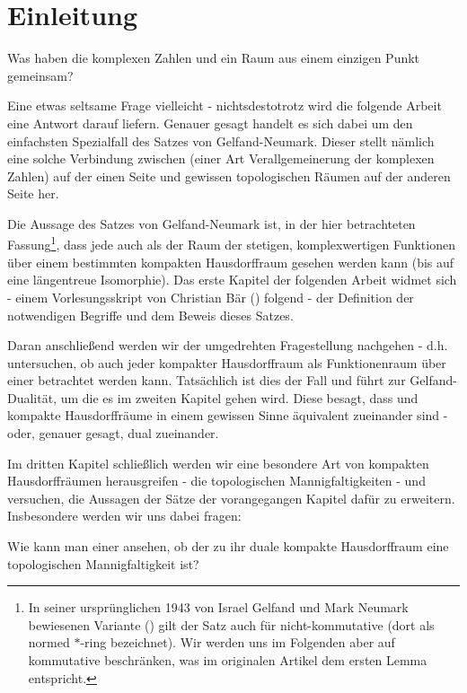 {}
\section*{Einleitung}

\begin{center}
Was haben die komplexen Zahlen und ein Raum aus einem einzigen Punkt gemeinsam? 
\end{center}

Eine etwas seltsame Frage vielleicht - nichtsdestotrotz wird die folgende Arbeit eine Antwort darauf liefern. Genauer gesagt handelt es sich dabei um den einfachsten Spezialfall des Satzes von Gelfand-Neumark. Dieser stellt nämlich eine solche Verbindung zwischen \CAlgn{} (einer Art Verallgemeinerung der komplexen Zahlen) auf der einen Seite und gewissen topologischen Räumen auf der anderen Seite her. 

Die Aussage des Satzes von Gelfand-Neumark ist, in der hier betrachteten Fassung\footnote{In seiner ursprünglichen 1943 von Israel Gelfand und Mark Neumark bewiesenen Variante (\cite[Theorem 1]{GN1943}) gilt der Satz auch für nicht-kommutative \CAlgn{} (dort als \glqq normed $*$-ring\grqq{} bezeichnet). Wir werden uns im Folgenden aber auf kommutative \CAlgn{} beschränken, was im originalen Artikel dem ersten Lemma entspricht.}, dass jede \CAlg{} auch als der Raum der stetigen, komplexwertigen Funktionen über einem bestimmten kompakten Hausdorffraum gesehen werden kann (bis auf eine längentreue Isomorphie). Das erste Kapitel der folgenden Arbeit widmet sich - einem Vorlesungsskript von Christian Bär (\cite[S. 49-69]{Baer2003}) folgend - der Definition der notwendigen Begriffe und dem Beweis dieses Satzes.

Daran anschließend werden wir der \glqq umgedrehten\grqq{} Fragestellung nachgehen - d.h. untersuchen, ob auch jeder kompakter Hausdorffraum als Funktionenraum über einer \CAlg{} betrachtet werden kann. Tatsächlich ist dies der Fall und führt zur Gelfand-Dualität, um die es im zweiten Kapitel gehen wird. Diese besagt, dass \CAlgn{} und kompakte Hausdorffräume in einem gewissen Sinne äquivalent zueinander sind - oder, genauer gesagt, dual zueinander.

Im dritten Kapitel schließlich werden wir eine besondere Art von kompakten Hausdorffräumen herausgreifen - die topologischen Mannigfaltigkeiten - und versuchen, die Aussagen der Sätze der vorangegangen Kapitel dafür zu erweitern. Insbesondere werden wir uns dabei fragen:

\begin{center}
Wie kann man einer \CAlg{} \glqq ansehen\grqq{}, ob der zu ihr duale kompakte Hausdorffraum eine topologischen Mannigfaltigkeit ist?
\end{center}
